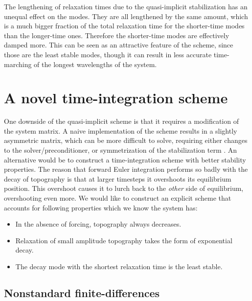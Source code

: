 \documentclass[preprint,12pt,authoryear]{elsarticle}
\begin{document}
The lengthening of relaxation times due to the quasi-implicit stabilization has an unequal 
effect on the modes. They are all lengthened by the same amount, which is a much bigger 
fraction of the total relaxation time for the shorter-time modes than the longer-time ones.
Therefore the shorter-time modes are effectively damped more.
This can be seen as an attractive feature of the scheme, since those are the least stable modes,
though it can result in less accurate time-marching of the longest wavelengths of the system.

\section{A novel time-integration scheme}

One downside of the quasi-implicit scheme is that it requires a modification of the system matrix.
A naive implementation of the scheme results in a slightly 
asymmetric matrix, which can be more difficult to solve, requiring either
changes to the solver/preconditioner, or symmetrization of the stabilization term \citep{kaus2010stabilization}.
An alternative would be to construct a time-integration scheme with better stability properties.  
The reason that forward Euler integration performs so badly with the decay of topography is that 
at larger timesteps it overshoots its equilibrium position. This overshoot causes it to lurch back 
to the \emph{other} side of equilibrium, overshooting even more.
We would like to construct an explicit scheme that accounts for following properties which we know the system has:
\begin{itemize}
\item In the absence of forcing, topography always decreases.
\item Relaxation of small amplitude topography takes the form of exponential decay.
\item The decay mode with the shortest relaxation time is the least stable.
\end{itemize}

\subsection{Nonstandard finite-differences}
\end{document}
